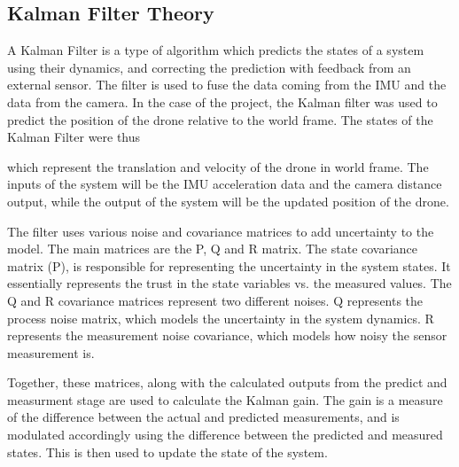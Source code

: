 \documentclass[bare_jrnl_transmag]{subfiles}
\begin{document}
\subsection{Kalman Filter Theory}
A Kalman Filter is a type of algorithm which predicts the states of a system using their dynamics, and correcting the prediction with feedback from an external sensor. The filter is used to fuse the data coming from the IMU and the data from the camera. 
In the case of the project, the Kalman filter was used to predict the position of the drone relative to the world frame. The states of the Kalman Filter were thus 

\begin{equation} 
    [ t_x, t_y, t_z, v_x, v_y, v_z ] 
\end{equation}  which represent the translation and velocity of the drone in world frame. 
The inputs of the system will be the IMU acceleration data and the camera distance output, while the output of the system will be the updated position of the drone.\newline

The filter uses various noise and covariance matrices to add uncertainty to the model. The main matrices are the P, Q and R matrix. The state covariance matrix (P), is responsible for representing the uncertainty in the system states. It essentially represents the trust in the state variables vs. the measured values.
The Q and R covariance matrices represent two different noises. Q represents the process noise matrix, which models the uncertainty in the system dynamics. R represents the measurement noise covariance, which models how noisy the sensor measurement is.\newline

Together, these matrices, along with the calculated outputs from the predict and measurment stage are used to calculate the Kalman gain. The gain is a measure of the difference between the actual and predicted measurements, and is modulated accordingly using the difference between the predicted and measured states. This is then used to update the state of the system. 
\end{document}
